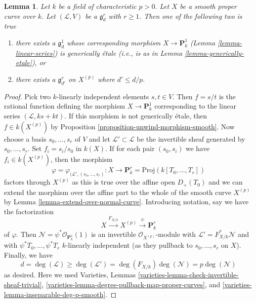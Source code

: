 \documentclass{stacks-project}
\theoremstyle{plain}
\newtheorem{lemma}[subsection]{Lemma}
\theoremstyle{definition}
\theoremstyle{remark}
\numberwithin{equation}{subsection}
\begin{document}
\begin{lemma}
\label{lemma-inseparable-linear-system}
Let $k$ be a field of characteristic $p > 0$. Let $X$ be a smooth proper
curve over $k$. Let $(\mathcal{L}, V)$ be a $\mathfrak g^r_d$ with $r \geq 1$.
Then one of the following two is true
\begin{enumerate}
\item there exists a $\mathfrak g^1_d$ whose corresponding morphism
$X \to \mathbf{P}^1_k$ (Lemma \ref{lemma-linear-series})
is generically \'etale (i.e., is as in Lemma \ref{lemma-generically-etale}), or
\item there exists a $\mathfrak g^r_{d'}$ on $X^{(p)}$ where
$d' \leq d/p$.
\end{enumerate}
\end{lemma}

\begin{proof}
Pick two $k$-linearly independent elements $s, t \in V$.
Then $f = s/t$ is the rational function defining the morphism
$X \to \mathbf{P}^1_k$ corresponding to the linear series
$(\mathcal{L}, ks + kt)$. If this morphism is not
generically \'etale, then $f \in k(X^{(p)})$ by
Proposition \ref{proposition-unwind-morphism-smooth}.
Now choose a basis $s_0, \ldots, s_r$ of $V$ and let
$\mathcal{L}' \subset \mathcal{L}$ be the invertible sheaf
generated by $s_0, \ldots, s_r$. Set $f_i = s_i/s_0$ in $k(X)$.
If for each pair $(s_0, s_i)$ we have $f_i \in k(X^{(p)})$, then
the morphism
$$
\varphi = \varphi_{(\mathcal{L}', (s_0, \ldots, s_r)} :
X
\longrightarrow
\mathbf{P}^r_k = \text{Proj}(k[T_0, \ldots, T_r])
$$
factors through $X^{(p)}$ as this is true over the affine open
$D_+(T_0)$ and we can extend the morphism over the affine part
to the whole of the smooth curve $X^{(p)}$ by
Lemma \ref{lemma-extend-over-normal-curve}.
Introducing notation, say we have the factorization
$$
X \xrightarrow{F_{X/k}} X^{(p)} \xrightarrow{\psi} \mathbf{P}^r_k
$$
of $\varphi$. Then $\mathcal{N} = \psi^*\mathcal{O}_{\mathbf{P}^1_k}(1)$
is an invertible $\mathcal{O}_{X^{(p)}}$-module with
$\mathcal{L}' = F_{X/k}^*\mathcal{N}$ and with
$\psi^*T_0, \ldots, \psi^*T_r$ $k$-linearly independent
(as they pullback to $s_0, \ldots, s_r$ on $X$).
Finally, we have
$$
d = \deg(\mathcal{L}) \geq \deg(\mathcal{L}') =
\deg(F_{X/k}) \deg(\mathcal{N}) = p \deg(\mathcal{N})
$$
as desired. Here we used Varieties, Lemmas
\ref{varieties-lemma-check-invertible-sheaf-trivial},
\ref{varieties-lemma-degree-pullback-map-proper-curves}, and
\ref{varieties-lemma-inseparable-deg-p-smooth}.
\end{proof}
\end{document}
